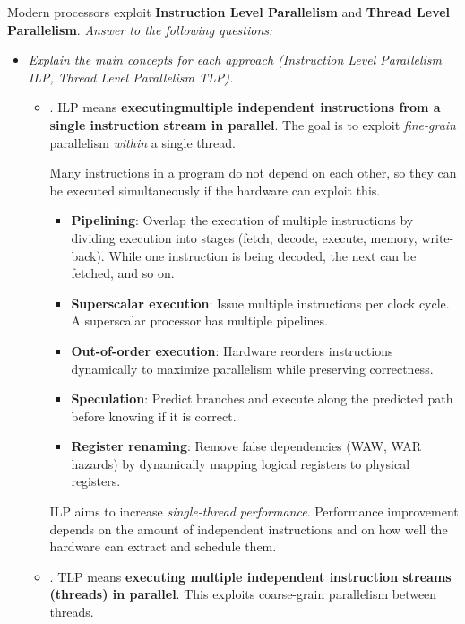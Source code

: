 Modern processors exploit \textbf{Instruction Level Parallelism} and \textbf{Thread Level Parallelism}. \emph{Answer to the following questions:}
\begin{itemize}
    \item \emph{Explain the main concepts for each approach (Instruction Level Parallelism ILP, Thread Level Parallelism TLP).}

    \answer
    \begin{itemize}
        \item {}. ILP means \textbf{executing\break multiple independent instructions from a single instruction stream in parallel}. The goal is to exploit \emph{fine-grain} parallelism \emph{within} a single thread.

        Many instructions in a program do not depend on each other, so they can be executed simultaneously if the hardware can exploit this.
        \begin{itemize}
            \item \textbf{Pipelining}: Overlap the execution of multiple instructions by dividing execution into stages (fetch, decode, execute, memory, write-back). While one instruction is being decoded, the next can be fetched, and so on.
            \item \textbf{Superscalar execution}: Issue multiple instructions per clock cycle. A superscalar processor has multiple pipelines.
            \item \textbf{Out-of-order execution}: Hardware reorders instructions dynamically to maximize parallelism while preserving correctness.
            \item \textbf{Speculation}: Predict branches and execute along the predicted path before knowing if it is correct.
            \item \textbf{Register renaming}: Remove false dependencies (WAW, WAR hazards) by dynamically mapping logical registers to physical registers.
        \end{itemize}
        ILP aims to increase \emph{single-thread performance}. Performance improvement depends on the amount of independent instructions and on how well the hardware can extract and schedule them.
        \item {}. TLP means \textbf{executing multiple independent instruction streams (threads) in parallel}. This exploits coarse-grain parallelism between threads.


\end{itemize}
\end{itemize}
